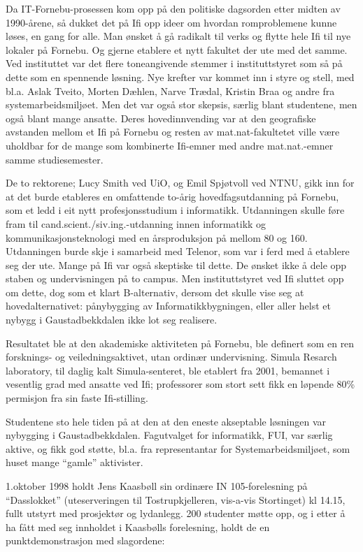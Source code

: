 \documentclass[../../main.tex]{subfiles}
\begin{document}
Da IT-Fornebu-prosessen kom opp på den politiske dagsorden etter midten av 1990-årene, så dukket det på Ifi opp ideer om hvordan romproblemene kunne løses, en gang for alle. Man ønsket å gå radikalt til verks og flytte hele Ifi til nye lokaler på Fornebu. Og gjerne etablere et nytt fakultet der ute med det samme. Ved instituttet var det flere toneangivende stemmer i instituttstyret som så på dette som en spennende løsning. Nye krefter var kommet inn i styre og stell, med bl.a. Aslak Tveito, Morten Dæhlen, Narve Trædal, Kristin Braa og andre fra systemarbeidsmiljøet. Men det var også stor skepsis, særlig blant studentene, men også blant mange ansatte. Deres hovedinnvending var at den geografiske avstanden mellom et Ifi på Fornebu og resten av mat.nat-fakultetet ville være uholdbar for de mange som kombinerte Ifi-emner med andre mat.nat.-emner samme studiesemester.

De to rektorene; Lucy Smith ved UiO, og Emil Spjøtvoll ved NTNU, gikk inn for at det burde etableres en omfattende to-årig hovedfagsutdanning på Fornebu, som et ledd i eit nytt profesjonsstudium i informatikk. Utdanningen skulle føre fram til cand.scient./siv.ing.-utdanning innen informatikk og
kommunikasjonsteknologi med en årsproduksjon på mellom 80 og 160. Utdanningen burde skje i samarbeid med Telenor, som var i ferd med å etablere seg der ute. Mange på Ifi var også skeptiske til dette. De ønsket ikke å dele opp staben og undervisningen på to campus. Men instituttstyret ved Ifi sluttet opp om dette, dog som et klart B-alternativ, dersom det skulle vise seg at hovedalternativet: pånybygging av Informatikkbygningen, eller aller helst et nybygg i Gaustadbekkdalen ikke lot seg realisere.

Resultatet ble at den akademiske aktiviteten på Fornebu, ble definert som en ren forsknings- og veiledningsaktivet, utan ordinær undervisning. Simula Resarch laboratory, til daglig kalt Simula-senteret, ble etablert fra 2001, bemannet i vesentlig grad med ansatte ved Ifi; professorer som stort sett fikk en løpende 80\% permisjon fra sin faste Ifi-stilling.

Studentene sto hele tiden på at den at den eneste akseptable løsningen var nybygging i Gaustadbekkdalen. Fagutvalget for informatikk, FUI, var særlig aktive, og fikk god støtte, bl.a. fra representantar for Systemarbeidsmiljøet, som huset mange ``gamle'' aktivister.

1.oktober 1998 holdt Jens Kaasbøll sin ordinære IN 105-forelesning på ``Dasslokket'' (uteserveringen til Tostrupkjelleren, vis-a-vis Stortinget) kl 14.15, fullt utstyrt med prosjektør og lydanlegg. 200 studenter møtte opp, og i etter å ha fått med seg innholdet i Kaasbølls forelesning, holdt de en punktdemonstrasjon med slagordene:
\end{document}

